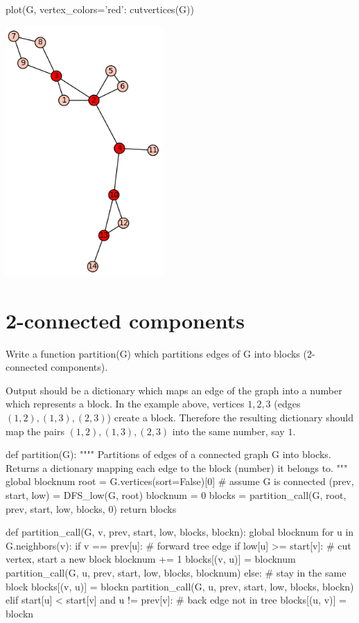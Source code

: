 \begin{sageCell}
    plot(G, vertex_colors={'red': cutvertices(G)})
\end{sageCell}
\begin{outImage}
    \includegraphics[width=0.45\textwidth]{Images/Low/output_cutvertices.png}
\end{outImage}

\section{2-connected components}

Write a function partition(G) which partitions edges of G into blocks (2-connected components).

Output should be a dictionary which maps an edge of the graph into a number which represents a block. In the example above, vertices $1, 2, 3$ (edges $(1,2), (1,3), (2,3)$) create a block. Therefore the resulting dictionary should map the pairs $(1,2), (1,3), (2,3)$ into the same number, say $1$.

\medskip
\begin{sageCell}
def partition(G):
    """"
    Partitions of edges of a connected graph G into blocks.
    Returns a dictionary mapping each edge to the block (number) it belongs to.
    """
    global blocknum
    root = G.vertices(sort=False)[0]     # assume G is connected
    (prev, start, low) = DFS_low(G, root)
    blocknum = 0
    blocks = {}
    partition_call(G, root, prev, start, low, blocks, 0)
    return blocks

def partition_call(G, v, prev, start, low, blocks, blockn):
    global blocknum
    for u in G.neighbors(v):
        if v == prev[u]: # forward tree edge
            if low[u] >= start[v]: # cut vertex, start a new block
                blocknum += 1
                blocks[(v, u)] = blocknum
                partition_call(G, u, prev, start, low, blocks, blocknum)
            else: # stay in the same block
                blocks[(v, u)] = blockn
                partition_call(G, u, prev, start, low, blocks, blockn)
        elif start[u] < start[v] and u != prev[v]: # back edge not in tree
            blocks[(u, v)] = blockn
\end{sageCell}

